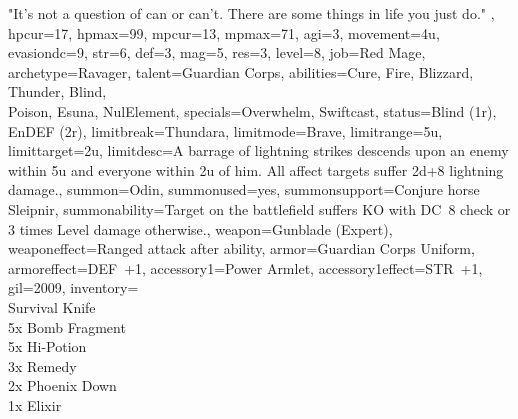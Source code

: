 \documentclass[a4paper, titlepage, 11pt, twocolumn] {article}
\begin{document}
{{		"It's not a question of can or can't. There are some things in life you just do."
	},
	hpcur=17, hpmax=99, mpcur=13, mpmax=71, agi=3, movement=4u, evasiondc=9, str=6, def=3, mag=5, res=3, 
	level=8, job=Red Mage, archetype=Ravager, talent=Guardian Corps,
	abilities={Cure, Fire, Blizzard, Thunder, Blind,\\ Poison, Esuna, NulElement},
	specials={Overwhelm, Swiftcast}, status={Blind (1r), EnDEF (2r)},
	limitbreak=Thundara, limitmode=Brave, limitrange=5u, limittarget=2u, 
	limitdesc={A barrage of lightning strikes descends upon an enemy within 5u and everyone within 2u of him. All affect targets suffer 2d+8 lightning damage.},
	summon=Odin, summonused=yes, summonsupport={Conjure horse Sleipnir}, summonability={Target on the battlefield suffers KO with DC~8 check or 3 times Level damage otherwise.},
	weapon=Gunblade (Expert), weaponeffect=Ranged attack after ability, armor=Guardian Corps Uniform, armoreffect=DEF~+1, accessory1=Power Armlet, accessory1effect=STR~+1,
	gil=2009, inventory={\\Survival Knife\\ 5x Bomb Fragment\\ 5x Hi-Potion\\ 3x Remedy\\ 2x Phoenix Down\\ 1x Elixir}
}
\clearpage
%
\end{document}
